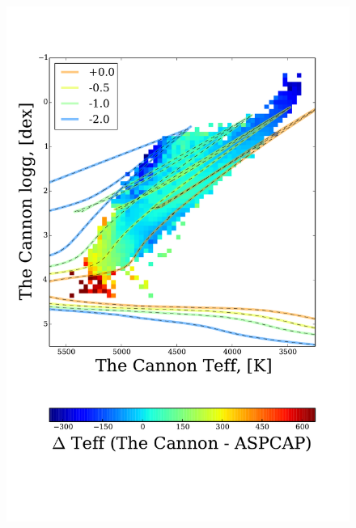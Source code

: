 \documentclass[12pt, preprint]{aastex}
\begin{document}
\begin{figure}[!h]
\centering
  \includegraphics[scale=0.26]{./plots/aftersubmit/t_diff2.pdf}

\end{figure}
\end{document}

